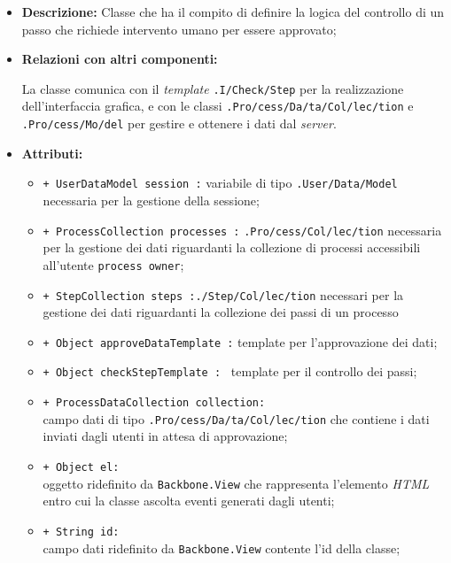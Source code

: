 \begin{flushleft}
\begin{itemize}
\item \textbf{Descrizione:} Classe che ha il compito di definire la logica del controllo di un passo che richiede intervento umano per essere approvato;
\item \textbf{Relazioni con altri componenti:}
\begin{sloppypar}
La classe comunica con il \textit{template} \texttt{\viewAdmin{}.I\fshyp{}Check\fshyp{}Step} per la realizzazione dell'interfaccia grafica, e con le classi \texttt{\collectionp{}.Pro\fshyp{}cess\fshyp{}Da\fshyp{}ta\fshyp{}Col\fshyp{}lec\fshyp{}tion} e \texttt{\modelAdmin{}.Pro\fshyp{}cess\fshyp{}Mo\fshyp{}del} per gestire e ottenere i dati dal \textit{server}.
\end{sloppypar}
\item \textbf{Attributi:}
\begin{sloppypar}
\begin{itemize}
\item \texttt{+ UserDataModel session :} variabile di tipo \texttt{\model{}.User\fshyp{}Data\fshyp{}Model} necessaria per la gestione della sessione;
\item \texttt{+ ProcessCollection processes :} \texttt{\collectionp{}.Pro\fshyp{}cess\fshyp{}Col\fshyp{}lec\fshyp{}tion} necessaria per la gestione dei dati riguardanti la collezione di processi accessibili all'utente \texttt{process owner};
\item \texttt{+ StepCollection steps :}\texttt{\collectionp{}.\fshyp{}Step\fshyp{}Col\fshyp{}lec\fshyp{}tion} necessari per la gestione dei dati riguardanti la collezione dei passi di un processo
\item \texttt{+ Object approveDataTemplate :} template per l'approvazione dei dati;
\item \texttt{+ Object checkStepTemplate : } template per il controllo dei passi;
\item \texttt{+ ProcessDataCollection collection:}\\ campo dati di tipo \texttt{\collectionp{}.Pro\fshyp{}cess\fshyp{}Da\fshyp{}ta\fshyp{}Col\fshyp{}lec\fshyp{}tion} che contiene i dati inviati dagli utenti in attesa di approvazione;
\item \texttt{+ Object el:}\\ oggetto ridefinito da \texttt{Backbone.View} che rappresenta l'elemento \textit{HTML} entro cui la classe ascolta eventi generati dagli utenti;
\item \texttt{+ String id:}\\ campo dati ridefinito da \texttt{Backbone.View} contente l'id della classe;

\end{itemize}
\end{sloppypar}
\end{itemize}
\end{flushleft}
